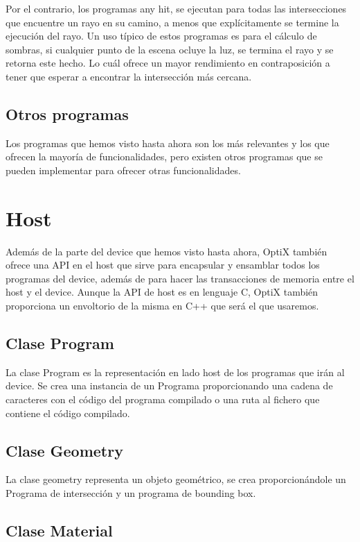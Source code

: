 Por el contrario, los programas any hit, se ejecutan para todas las intersecciones que encuentre un rayo en su camino, a menos que explícitamente se termine la ejecución del rayo.
Un uso típico de estos programas es para el cálculo de sombras, si cualquier punto de la escena ocluye la luz, se termina el rayo y se retorna este hecho. Lo cuál ofrece un mayor rendimiento en contraposición a tener que esperar a encontrar la intersección más cercana.

\subsection{Otros programas}

Los programas que hemos visto hasta ahora son los más relevantes y los que ofrecen la mayoría de funcionalidades, pero existen otros programas que se pueden implementar para ofrecer otras funcionalidades.

\clearpage

\section{Host}

Además de la parte del device que hemos visto hasta ahora, OptiX también ofrece una API en el host que sirve para encapsular y ensamblar todos los programas del device, además de para hacer las transacciones de memoria entre el host y el device. Aunque la API de host es en lenguaje C, OptiX también proporciona un envoltorio de la misma en C++ que será el que usaremos. 

\subsection{Clase Program}

La clase Program es la representación en lado host de los programas que irán al device.
Se crea una instancia de un Programa proporcionando una cadena de caracteres con el código del programa compilado o una ruta al fichero que contiene el código compilado. 

\subsection{Clase Geometry}

La clase geometry representa un objeto geométrico, se crea proporcionándole un Programa de intersección y un programa de bounding box.

\subsection{Clase Material}


